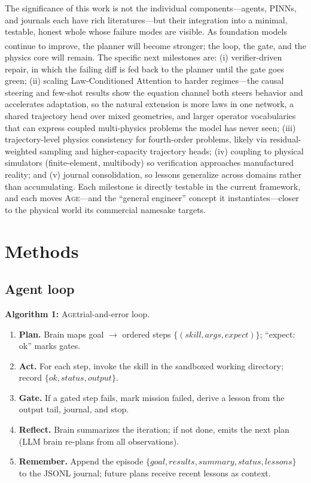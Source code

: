 \documentclass[11pt,a4paper]{article}
\newcommand{\Age}{\textsc{Age}}
\newcommand{\pn}{\textsuperscript}
\begin{document}
The significance of this work is not the individual components---agents,
PINNs, and journals each have rich literatures---but their integration into
a minimal, testable, honest whole whose failure modes are visible. As
foundation models continue to improve\pn{\citep{brown2020,bubeck2023,bommasani2021}},
the planner will become stronger; the loop, the gate, and the physics core
will remain. The specific next milestones are: (i) verifier-driven repair, in
which the failing diff is fed back to the planner until the gate goes green;
(ii) scaling Law-Conditioned Attention to harder regimes---the causal
steering and few-shot results show the equation channel both steers
behavior and accelerates adaptation, so the natural extension is more laws
in one network, a shared trajectory head over mixed geometries, and larger
operator vocabularies that can express coupled multi-physics problems the
model has never seen; (iii) trajectory-level physics consistency for
fourth-order problems, likely via residual-weighted sampling and
higher-capacity trajectory heads; (iv) coupling to physical simulators
(finite-element, multibody) so verification approaches manufactured
reality; and (v) journal consolidation, so lessons generalize across
domains rather than accumulating. Each milestone is
directly testable in the current framework, and each moves \Age---and the
``general engineer'' concept it instantiates---closer to the physical world
its commercial namesake targets.

\section*{Methods}

\subsection*{Agent loop}

\textbf{Algorithm 1:} \Age trial-and-error loop.
\begin{enumerate}[label=\arabic*., leftmargin=1.6em]
\label{alg:loop}
\item \textbf{Plan.} Brain maps goal $\to$ ordered steps
      $\{(skill, args, expect)\}$; ``expect: ok'' marks gates.
\item \textbf{Act.} For each step, invoke the skill in the sandboxed working
      directory; record $\{ok, status, output\}$.
\item \textbf{Gate.} If a gated step fails, mark mission failed, derive a
      lesson from the output tail, journal, and stop.
\item \textbf{Reflect.} Brain summarizes the iteration; if not done, emits
      the next plan (LLM brain re-plans from all observations).
\item \textbf{Remember.} Append the episode $\{goal, results, summary,
      status, lessons\}$ to the JSONL journal; future plans receive recent
      lessons as context.
\end{enumerate}
\end{document}
